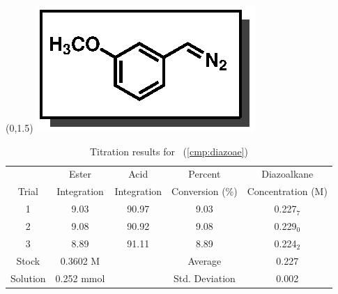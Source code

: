 \begin{singlespace}
\begin{table}[htbp]
\begin{textblock}{1}(0,1.5)
\includegraphics[scale=0.8]{chp_asymmetric/images/diazoae}
\end{textblock}
\flushright
{\small
\begin{tabular}{ccccc} 
\toprule
&Ester&Acid&Percent&Diazoalkane\\
Trial&Integration&Integration&Conversion (\%)&Concentration (M) \\ 
\midrule
1 & 9.03 & 90.97 & 9.03 & 0.227$_7$ \\
2 & 9.08 & 90.92 & 9.08 & 0.229$_0$ \\
3 & 8.89 & 91.11 & 8.89 & 0.224$_2$ \\
\midrule
Stock & 0.3602 M & & Average & 0.227 \\
Solution & 0.252 mmol & & Std. Deviation & 0.002 \\
\bottomrule
\end{tabular}
\caption{Titration results for \CMPdiazoae~(\ref{cmp:diazoae})}
}
\end{table}
\end{singlespace}

